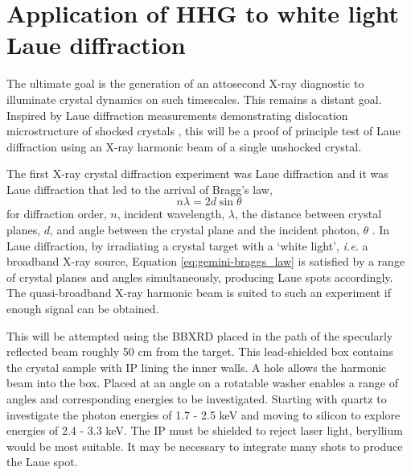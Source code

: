 
\section{Application of HHG to white light Laue diffraction}\label{sec:ch4-laue}
The ultimate goal is the generation of an attosecond X-ray diagnostic to illuminate crystal dynamics on such timescales. This remains a distant goal. Inspired by Laue diffraction measurements demonstrating dislocation microstructure of shocked crystals \cite{suggitNanosecondWhitelightLaue2012}, this will be a proof of principle test of Laue diffraction using an X-ray harmonic beam of a single unshocked crystal.

The first X-ray crystal diffraction experiment was Laue diffraction and it was Laue diffraction that led to the arrival of Bragg's law,
\begin{equation}\label{eq:gemini-braggs_law}
	n\lambda = 2d\sin\theta
\end{equation}
for diffraction order, $n$, incident wavelength, $\lambda$, the distance between crystal planes, $d$, and angle between the crystal plane and the incident photon, $\theta$ \cite{braggDiffractionWaves1915}. In Laue diffraction, by irradiating a crystal target with a `white light', \textit{i.e. } a broadband X-ray source, Equation \ref{eq:gemini-braggs_law} is satisfied by a range of crystal planes and angles simultaneously, producing Laue spots accordingly. The quasi-broadband X-ray harmonic beam is suited to such an experiment if enough signal can be obtained.

This will be attempted using the \ac{BBXRD} placed in the path of the specularly reflected beam roughly 50 cm from the target. This lead-shielded box contains the crystal sample with IP lining the inner walls. A hole allows the harmonic beam into the box. Placed at an angle on a rotatable washer enables a range of angles and corresponding energies to be investigated. Starting with quartz to investigate the photon energies of 1.7 - 2.5 keV and moving to silicon to explore energies of 2.4 - 3.3 keV. The IP must be shielded to reject laser light, beryllium would be most suitable. It may be necessary to integrate many shots to produce the Laue spot.


